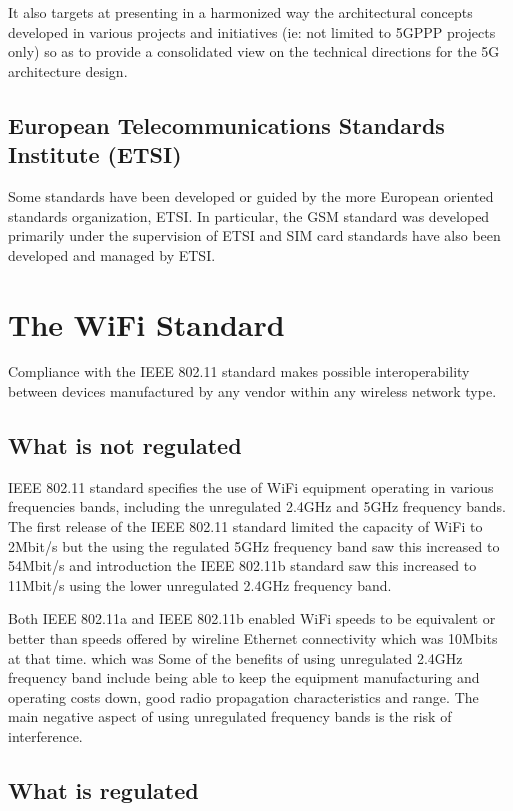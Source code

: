It also targets at presenting in a harmonized way the architectural
concepts developed in various projects and initiatives (ie: not limited
to 5GPPP projects only) so as to provide a consolidated view on the
technical directions for the 5G architecture design.

\subsection{European Telecommunications Standards Institute (ETSI)}
\label{ETSI}

Some standards have been developed or guided by the more European
oriented standards organization, ETSI. In particular, the GSM \cite{GSM}
standard was developed primarily under the supervision of ETSI and
SIM card standards have also been developed and managed by ETSI.

\section{The WiFi Standard}

Compliance with the IEEE 802.11 standard \cite{ieee802_11standard}
makes possible interoperability between devices manufactured by any
vendor within any wireless network type.

\subsection{What is not regulated}

IEEE 802.11 standard specifies the use of WiFi equipment operating
in various frequencies bands, including the unregulated 2.4GHz and
5GHz frequency bands.  The first release of the IEEE 802.11 standard
limited the capacity of WiFi to 2Mbit/s but the  using the regulated
5GHz frequency band saw this increased to 54Mbit/s and introduction the
IEEE 802.11b standard saw this increased to 11Mbit/s using the lower
unregulated 2.4GHz frequency band.

Both IEEE 802.11a and IEEE 802.11b enabled WiFi speeds to be equivalent
or better than speeds offered by wireline Ethernet connectivity
which was  10Mbits at that time. which was Some of the benefits of
using unregulated 2.4GHz frequency band include being able to keep the
equipment manufacturing and operating costs down, good radio propagation
characteristics and range.  The main negative aspect of using unregulated
frequency bands is the risk of interference.

\subsection{What is regulated}

